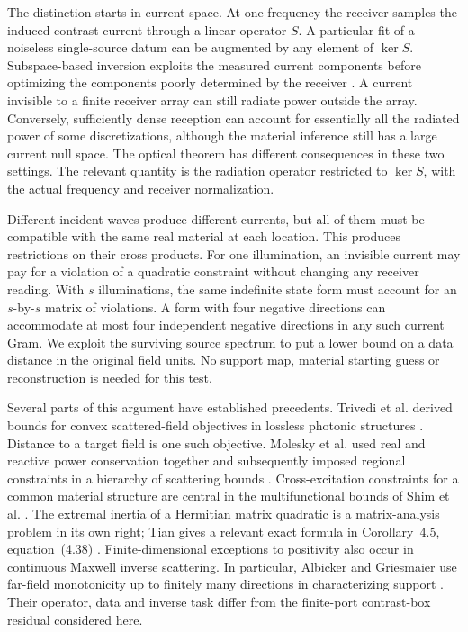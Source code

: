 \documentclass[anonymous,12pt]{iopjournal}
\theoremstyle{remark}\newtheorem{remark}[theorem]{Remark}
\numberwithin{equation}{section}
\begin{document}
The distinction starts in current space. At one frequency the receiver samples the induced contrast current through a linear operator $S$. A particular fit of a noiseless single-source datum can be augmented by any element of $\ker S$. Subspace-based inversion exploits the measured current components before optimizing the components poorly determined by the receiver \cite{chen,zhong}. A current invisible to a finite receiver array can still radiate power outside the array. Conversely, sufficiently dense reception can account for essentially all the radiated power of some discretizations, although the material inference still has a large current null space. The optical theorem has different consequences in these two settings. The relevant quantity is the radiation operator restricted to $\ker S$, with the actual frequency and receiver normalization.

Different incident waves produce different currents, but all of them must be compatible with the same real material at each location. This produces restrictions on their cross products. For one illumination, an invisible current may pay for a violation of a quadratic constraint without changing any receiver reading. With $s$ illuminations, the same indefinite state form must account for an $s$-by-$s$ matrix of violations. A form with four negative directions can accommodate at most four independent negative directions in any such current Gram. We exploit the surviving source spectrum to put a lower bound on a data distance in the original field units. No support map, material starting guess or reconstruction is needed for this test.

Several parts of this argument have established precedents. Trivedi et al. derived bounds for convex scattered-field objectives in lossless photonic structures \cite{trivedi}. Distance to a target field is one such objective. Molesky et al. used real and reactive power conservation together and subsequently imposed regional constraints in a hierarchy of scattering bounds \cite{moleskyglobal,moleskylocal}. Cross-excitation constraints for a common material structure are central in the multifunctional bounds of Shim et al. \cite{shim}. The extremal inertia of a Hermitian matrix quadratic is a matrix-analysis problem in its own right; Tian gives a relevant exact formula in Corollary~4.5, equation~(4.38) \cite{tian}. Finite-dimensional exceptions to positivity also occur in continuous Maxwell inverse scattering. In particular, Albicker and Griesmaier use far-field monotonicity up to finitely many directions in characterizing support \cite{albicker}. Their operator, data and inverse task differ from the finite-port contrast-box residual considered here.
\end{document}
